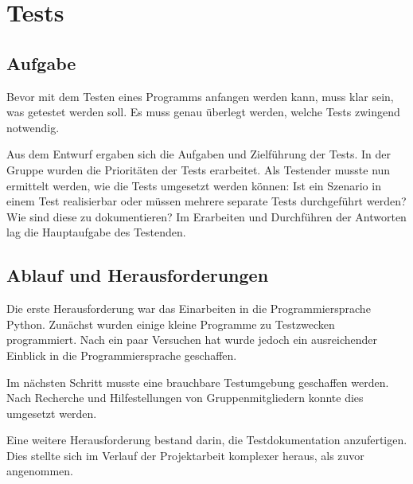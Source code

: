 \documentclass{scrartcl}
\date{}
\begin{document}
\maketitle
\tableofcontents
\renewcommand{\maketitle}{}
\renewcommand{\tableofcontents}{}
\section{Tests}
\subsection{Aufgabe}
Bevor mit dem Testen eines Programms anfangen werden kann, muss klar sein, was getestet werden soll. Es muss genau überlegt werden, welche Tests zwingend notwendig.

Aus dem Entwurf ergaben sich die Aufgaben und Zielführung der Tests. In der Gruppe wurden die Prioritäten der Tests erarbeitet. Als Testender musste nun ermittelt werden, wie die Tests umgesetzt werden können: Ist ein Szenario in einem Test realisierbar oder müssen mehrere separate Tests durchgeführt werden? Wie sind diese zu dokumentieren? Im Erarbeiten und Durchführen der Antworten lag die Hauptaufgabe des Testenden.

\subsection{Ablauf und Herausforderungen}
Die erste Herausforderung war das Einarbeiten in die Programmiersprache Python. Zunächst wurden einige kleine Programme zu Testzwecken programmiert. Nach ein paar Versuchen hat wurde jedoch ein ausreichender Einblick in die Programmiersprache geschaffen. 

Im nächsten Schritt musste eine brauchbare Testumgebung geschaffen werden. Nach Recherche und Hilfestellungen von Gruppenmitgliedern konnte dies umgesetzt werden.

Eine weitere Herausforderung bestand darin, die Testdokumentation anzufertigen. Dies stellte sich im Verlauf der Projektarbeit komplexer heraus, als zuvor angenommen.
\end{document}
